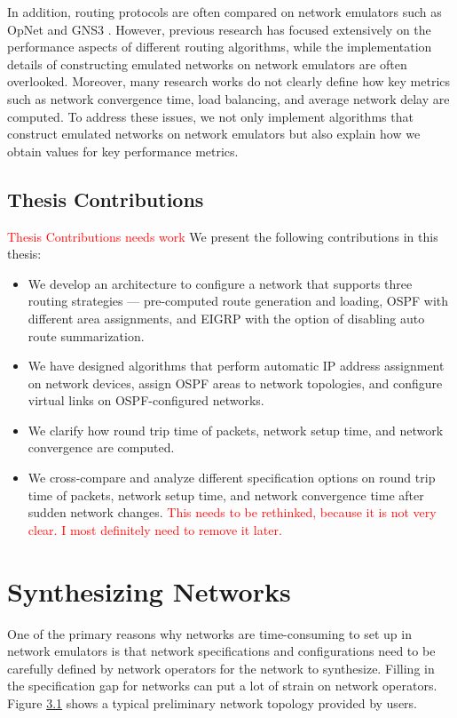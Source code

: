 \documentclass{uiucthesis2021}
\begin{document}
\noindent In addition, routing protocols are often compared on network emulators such as OpNet \cite{Kodzo2016,okonkwo2020comparative,6533929} and GNS3 \cite{7250212}. However, previous research has focused extensively on the performance aspects of different routing algorithms, while the implementation details of constructing emulated networks on network emulators are often overlooked. Moreover, many research works do not clearly define how key metrics such as network convergence time, load balancing, and average network delay are computed. To address these issues, we not only implement algorithms that construct emulated networks on network emulators but also explain how we obtain values for key performance metrics.

\section{Thesis Contributions}
\noindent \textcolor{red}{Thesis Contributions needs work} We present the following contributions in this thesis: 
\begin{itemize}
    \item We develop an architecture to configure a network that supports three routing strategies --- pre-computed route generation and loading, OSPF with different area assignments, and EIGRP with the option of disabling auto route summarization. 
    \item We have designed algorithms that perform automatic IP address assignment on network devices, assign OSPF areas to network topologies, and configure virtual links on OSPF-configured networks. 
    \item We clarify how round trip time of packets, network setup time, and network convergence are computed.
    \item We cross-compare and analyze different specification options on round trip time of packets, network setup time, and network convergence time after sudden network changes. \textcolor{red}{This needs to be rethinked, because it is not very clear. I most definitely need to remove it later.}
\end{itemize}

\chapter{Synthesizing Networks}
\label{c3}
\noindent One of the primary reasons why networks are time-consuming to set up in network emulators is that network specifications and configurations need to be carefully defined by network operators for the network to synthesize. Filling in the specification gap for networks can put a lot of strain on network operators. Figure \hyperref[f31]{3.1} shows a typical preliminary network topology provided by users.\\
\end{document}
